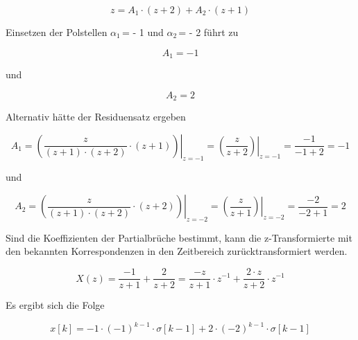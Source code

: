 \begin{equation}\label{eq:fiveninetyseven}
z=A_{1} \cdot \left(z+2\right)+A_{2} \cdot \left(z+1\right)
\end{equation}

\noindent Einsetzen der Polstellen $\alpha$${}_{1\ }$= - 1 und $\alpha$${}_{2\ }$= - 2 f\"{u}hrt zu 

\begin{equation}\label{eq:fiveninetyeight}
A_{1} =-1
\end{equation}

\noindent und

\begin{equation}\label{eq:fiveninetynine}
A_{2} =2
\end{equation}

\noindent Alternativ h\"{a}tte der Residuensatz ergeben

\begin{equation}\label{eq:fiveonehundred}
A_{1} =\left. \left(\frac{z}{\left(z+1\right)\cdot \left(z+2\right)} \cdot \left(z+1\right)\right)\right|_{z=-1} =\left. \left(\frac{z}{z+2} \right)\right|_{z=-1} =\frac{-1}{-1+2} =-1
\end{equation}

\noindent und

\begin{equation}\label{eq:fiveonehundredone}
A_{2} =\left. \left(\frac{z}{\left(z+1\right)\cdot \left(z+2\right)} \cdot \left(z+2\right)\right)\right|_{z=-2} =\left. \left(\frac{z}{z+1} \right)\right|_{z=-2} =\frac{-2}{-2+1} =2
\end{equation}

\noindent Sind die Koeffizienten der Partialbr\"{u}che bestimmt, kann die z-Transformierte mit den bekannten Korrespondenzen in den Zeitbereich zur\"{u}cktransformiert werden.

\begin{equation}\label{eq:fiveonehundredtwo}
X\left(z\right)=\frac{-1}{z+1} +\frac{2}{z+2} =\frac{-z}{z+1} \cdot z^{-1} +\frac{2\cdot z}{z+2} \cdot z^{-1}
\end{equation}

\noindent Es ergibt sich die Folge

\begin{equation}\label{eq:fiveonehundredthree}
x\left[k\right]=-1\cdot \left(-1\right)^{k-1} \cdot \sigma \left[k-1\right]+2\cdot \left(-2\right)^{k-1} \cdot \sigma \left[k-1\right]
\end{equation}

\clearpage

